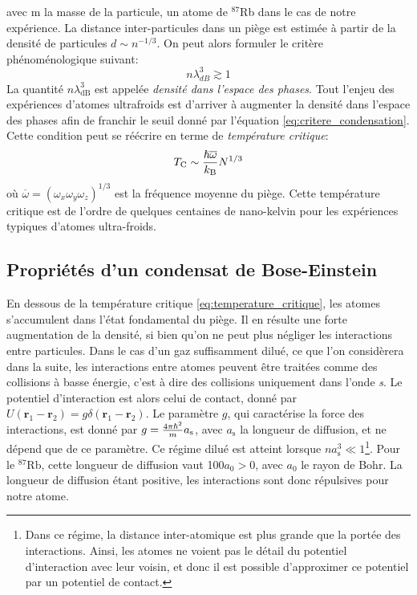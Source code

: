avec m la masse de la particule, un atome de ${}^{87}$Rb dans le cas de notre expérience. La distance inter-particules dans un piège est estimée à partir de la densité de particules $d \sim n^{-1/3}$. On peut alors formuler le critère phénoménologique suivant:
\begin{equation}
n \lambda_{dB}^3 \gtrsim 1
\label{eq:critere_condensation}
\end{equation}
La quantité $n \lambda_{\mathrm{dB}}^3$ est appelée \emph{densité dans l'espace des phases}. Tout l'enjeu des expériences d'atomes ultrafroids est d'arriver à augmenter la densité dans l'espace des phases afin de franchir le seuil donné par l'équation \ref{eq:critere_condensation}. Cette condition peut se réécrire en terme de \emph{température critique}:
\begin{equation}
T_{\mathrm{C}}\sim \frac{\hslash \overline{\omega}}{k_{\mathrm{B}}}N^{1/3}
\label{eq:temperature_critique}
\end{equation}
où $\overline{\omega}=(\omega_x \omega_y \omega_z)^{1/3}$ est la fréquence moyenne du piège. Cette température critique est de l'ordre de quelques centaines de nano-kelvin pour les expériences typiques d'atomes ultra-froids.


\subsection{Propriétés d'un condensat de Bose-Einstein}
En dessous de la température critique \ref{eq:temperature_critique}, les atomes s'accumulent dans l'état fondamental du piège. Il en résulte une forte augmentation de la densité, si bien qu'on ne peut plus négliger les interactions entre particules. Dans le cas d'un gaz suffisamment dilué, ce que l'on considèrera dans la suite, les interactions entre atomes peuvent être traitées comme des collisions à basse énergie, c'est à dire des collisions uniquement dans l'onde \emph{s}. Le potentiel d'interaction est alors celui de contact, donné par $U(\mathbf{r}_1-\mathbf{r}_2)=g\delta(\mathbf{r}_1-\mathbf{r}_2)$. Le paramètre $g$, qui caractérise la force des interactions, est donné par $g=\frac{4 \pi \hslash^2}{m}a_{\mathrm{s}}$, avec $a_{\mathrm{s}}$ la longueur de diffusion, et ne dépend que de ce paramètre. Ce régime dilué est atteint lorsque $na_{\mathrm{s}}^3\ll 1$\footnote{Dans ce régime, la distance inter-atomique est plus grande que la portée des interactions. Ainsi, les atomes ne voient pas le détail du potentiel d'interaction avec leur voisin, et donc il est possible d'approximer ce potentiel par un potentiel de contact.}. Pour le ${}^{87}$Rb, cette longueur de diffusion vaut 100$a_{\mathrm{0}}>0$, avec $a_{\mathrm{0}}$ le rayon de Bohr. La longueur de diffusion étant positive, les interactions sont donc répulsives pour notre atome.

